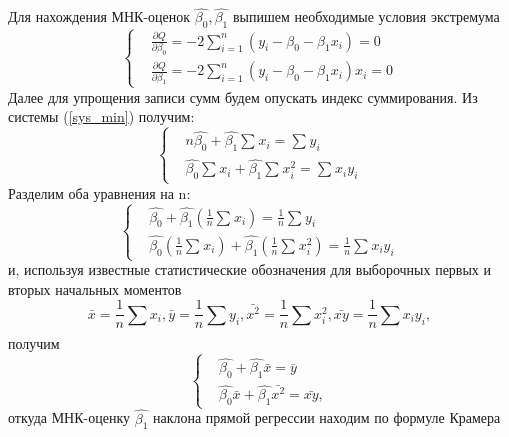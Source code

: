 \documentclass[12pt]{article}
\begin{document}
	Для нахождения МНК-оценок $\hat{\beta_0}, \hat{\beta_1}$ выпишем необходимые условия экстремума
	\begin{equation}
		\begin{cases}
			& \frac{\partial Q}{\partial \beta_{0}}  = 
			-2\sum_{i=1}^{n}{(y_{i} - \beta_{0} - \beta_{1}x_{i})} = 0\\ 
			& \frac{\partial Q}{\partial \beta_{1}}  = 
			-2\sum_{i=1}^{n}{(y_{i} - \beta_{0} - \beta_{1}x_{i})x_{i}} = 0 
		\end{cases}
		\label{sys_min}
	\end{equation}
	Далее для упрощения записи сумм будем опускать индекс суммирования. Из системы (\ref{sys_min}) получим:
	\begin{equation}
		\begin{cases}
			& n\hat{\beta_{0}} + \hat{\beta_{1}}\sum_{}{}{x_{i}} = 
			\sum_{}{}{y_{i}}\\ 
			& \hat{\beta_{0}}\sum_{}{}{x_{i}} + \hat{\beta_{1}}\sum_{}{}{x_{i}^{2}} = \sum_{}{}{x_{i}y_{i}}
		\end{cases}
		\label{sys_2}
	\end{equation}
	Разделим оба уравнения на n:
	\begin{equation}
		\begin{cases}
			& \hat{\beta_{0}} + \hat{\beta_{1}}(\frac{1}{n}\sum_{}{}{x_{i}}) = 
			\frac{1}{n}\sum_{}{}{y_{i}}\\ 
			& \hat{\beta_{0}}(\frac{1}{n}\sum_{}{}{x_{i}}) + \hat{\beta_{1}}(\frac{1}{n}\sum_{}{}{x_{i}^{2}}) = \frac{1}{n}\sum_{}{}{x_{i}y_{i}}
		\end{cases}
		\label{sys_3}
	\end{equation}
	и, используя известные статистические обозначения для выборочных первых и вторых начальных моментов
	\begin{equation}
		\bar{x} = \frac{1}{n}\sum_{}{}{x_{i}}, \bar{y} = \frac{1}{n}\sum_{}{}{y_{i}}, \bar{x^{2}} = \frac{1}{n}\sum_{}{}{x_{i}^{2}}, \bar{xy} = \frac{1}{n}\sum_{}{}{x_{i}y_{i}}, 
	\end{equation}
	получим
	\begin{equation}
		\begin{cases}
			& \hat{\beta_{0}} + \hat{\beta_{1}}\bar{x} = 
			\bar{y}\\ 
			& \hat{\beta_{0}}\bar{x} + \hat{\beta_{1}}\bar{x^{2}} = \bar{xy},
		\end{cases}
		\label{sys_fin}
	\end{equation}
	откуда МНК-оценку $\hat{\beta_1}$ наклона прямой регрессии находим по формуле Крамера
\end{document}
